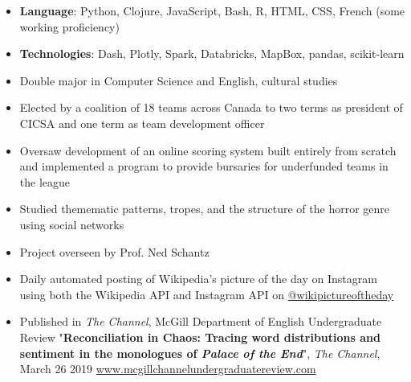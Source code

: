 \begin{itemize}
\item \textbf{Language}: Python, Clojure, JavaScript, Bash, R, HTML, CSS, French (some working proficiency)
\item \textbf{Technologies}: Dash, Plotly, Spark, Databricks, MapBox, pandas, scikit-learn
\end{itemize}

\begin{itemize}
\item Double major in Computer Science and English, cultural studies
\end{itemize}

\begin{itemize}
\item Elected by a coalition of 18 teams across Canada to two terms as president of CICSA and one term as team development officer
\item Oversaw development of an online scoring system built entirely from scratch and implemented a program to provide bursaries for underfunded teams in the league
\end{itemize}

\begin{itemize}
\item  Studied themematic patterns, tropes, and the structure of the horror genre using social networks
\item Project overseen by Prof. Ned Schantz
\end{itemize}
\begin{itemize}
\item Daily automated posting of Wikipedia's picture of the day on Instagram using both the Wikipedia API and Instagram API on \href{http://instagram.com/wikipictureoftheday}{@wikipictureoftheday}
\end{itemize}


\begin{itemize}
\item  Published in \textit{The Channel}, McGill Department of English Undergraduate Review "\textbf{Reconciliation in Chaos: Tracing word distributions and sentiment in the monologues of \textit{Palace of the End}}", \textit{The Channel}, March 26 2019 \href{http://mcgillchannelundergraduatereview.com/2019/03/reconciliation-in-chaos-tracing-word-distributions-and-sentiment-in-the-monologues-of-palace-of-the-end/}{www.mcgillchannelundergraduatereview.com}
\end{itemize}
